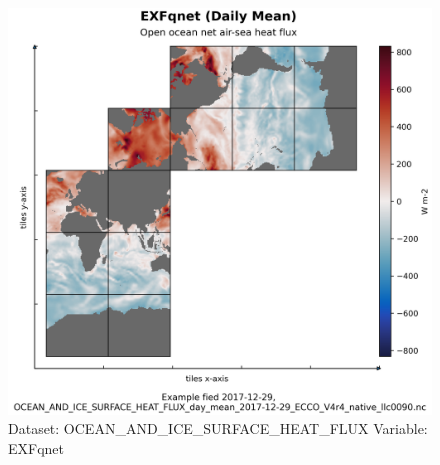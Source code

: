 \begin{figure}[H]
\centering
\includegraphics[width=\textwidth]{../images/plots/native_plots/Ocean_and_Sea-Ice_Surface_Heat_Fluxes/EXFqnet.png}
\caption{Dataset: OCEAN\_AND\_ICE\_SURFACE\_HEAT\_FLUX Variable: EXFqnet}
\label{tab:table-OCEAN_AND_ICE_SURFACE_HEAT_FLUX_EXFqnet-Plot}
\end{figure}
\pagebreak

